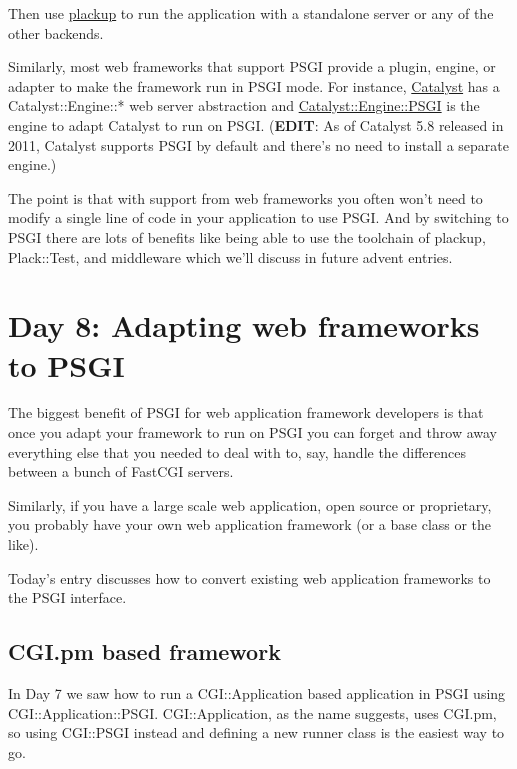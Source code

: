 Then use
\href{http://advent.plackperl.org/2009/12/day-3-using-plackup.html}{plackup}
to run the application with a standalone server or any of the other
backends.

Similarly, most web frameworks that support PSGI provide a plugin,
engine, or adapter to make the framework run in PSGI mode. For instance,
\href{http://www.catalystframework.org/}{Catalyst} has a
Catalyst::Engine::* web server abstraction and
\href{http://search.cpan.org/perldoc?Catalyst::Engine::PSGI}{Catalyst::Engine::PSGI}
is the engine to adapt Catalyst to run on PSGI. (\textbf{EDIT}: As of
Catalyst 5.8 released in 2011, Catalyst supports PSGI by default and
there's no need to install a separate engine.)

The point is that with support from web frameworks you often won't need
to modify a single line of code in your application to use PSGI. And by
switching to PSGI there are lots of benefits like being able to use the
toolchain of plackup, Plack::Test, and middleware which we'll discuss in
future advent entries.

\section{Day 8: Adapting web frameworks to
PSGI}\label{day-8-adapting-web-frameworks-to-psgi}

The biggest benefit of PSGI for web application framework developers is
that once you adapt your framework to run on PSGI you can forget and
throw away everything else that you needed to deal with to, say, handle
the differences between a bunch of FastCGI servers.

Similarly, if you have a large scale web application, open source or
proprietary, you probably have your own web application framework (or a
base class or the like).

Today's entry discusses how to convert existing web application
frameworks to the PSGI interface.

\subsection{CGI.pm based framework}\label{cgi.pm-based-framework}

In Day 7 we saw how to run a CGI::Application based application in PSGI
using CGI::Application::PSGI. CGI::Application, as the name suggests,
uses CGI.pm, so using CGI::PSGI instead and defining a new runner class
is the easiest way to go.

